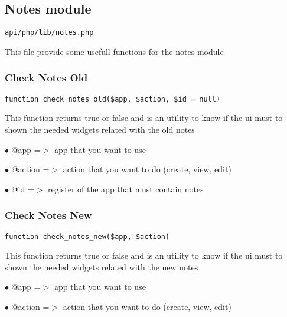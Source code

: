 \documentclass[a4paper]{article}
\begin{document}
\hypertarget{toc496}{}
\subsection{Notes module}

\begin{lstlisting}
api/php/lib/notes.php
\end{lstlisting}

This file provide some usefull functions for the notes module

\hypertarget{toc497}{}
\subsubsection{Check Notes Old}

\begin{lstlisting}
function check_notes_old($app, $action, $id = null)
\end{lstlisting}

This function returns true or false and is an utility to know if the ui
must to shown the needed widgets related with the old notes

\begin{compactitem}
\item[\color{myblue}$\bullet$] @app    =$>$ app that you want to use
\item[\color{myblue}$\bullet$] @action =$>$ action that you want to do (create, view, edit)
\item[\color{myblue}$\bullet$] @id     =$>$ register of the app that must contain notes
\end{compactitem}

\hypertarget{toc498}{}
\subsubsection{Check Notes New}

\begin{lstlisting}
function check_notes_new($app, $action)
\end{lstlisting}

This function returns true or false and is an utility to know if the ui
must to shown the needed widgets related with the new notes

\begin{compactitem}
\item[\color{myblue}$\bullet$] @app    =$>$ app that you want to use
\item[\color{myblue}$\bullet$] @action =$>$ action that you want to do (create, view, edit)
\end{compactitem}
\end{document}
